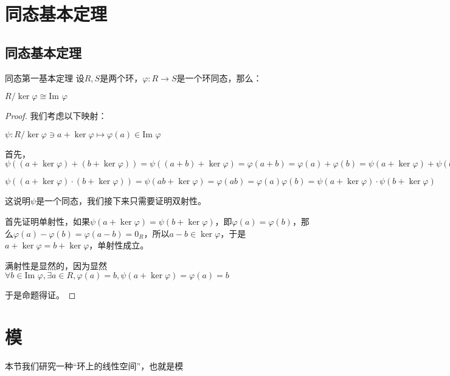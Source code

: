\documentclass[12pt, a4paper, oneside, UTF8]{ctexbook}
\begin{document}
	\section{同态基本定理}
		\subsection{同态基本定理}
			\begin{them}{同态第一基本定理}{}
				设$R,S$是两个环，$\varphi : R \rightarrow S$是一个环同态，那么：

				$R / \ker \varphi \cong \text{Im }\varphi $
			\end{them}
			\begin{proof}
				我们考虑以下映射：

				$\psi : R / \ker \varphi \ni a+\ker \varphi  \mapsto \varphi (a) \in \text{Im }\varphi $

				首先，$\psi \left((a+\ker \varphi )+(b+\ker \varphi )\right)=\psi \left((a+b)+\ker \varphi \right)=\varphi (a+b)=\varphi (a)+\varphi (b)=\psi (a+\ker \varphi )+\psi (b+\ker \varphi )$
				
				$\psi \left((a+\ker \varphi )\cdot (b+\ker \varphi )\right)=\psi (ab+\ker \varphi )=\varphi (ab)=\varphi (a)\varphi (b)=\psi (a+\ker \varphi )\cdot \psi (b+\ker \varphi )$

				这说明$\psi $是一个同态，我们接下来只需要证明双射性。

				首先证明单射性，如果$\psi (a+\ker \varphi )=\psi (b+\ker \varphi )$，即$\varphi (a)=\varphi (b)$，那么$\varphi (a)-\varphi (b)=\varphi (a-b)=0_R$，所以$a-b \in \ker \varphi $，于是$a+\ker \varphi =b+\ker \varphi $，单射性成立。

				满射性是显然的，因为显然$\forall b \in \text{Im }\varphi ,\exists a \in R,\varphi (a)=b,\psi (a+\ker \varphi )=\varphi (a)=b$

				于是命题得证。
			\end{proof}
	\section{模}
		本节我们研究一种“环上的线性空间”，也就是模
\end{document}
